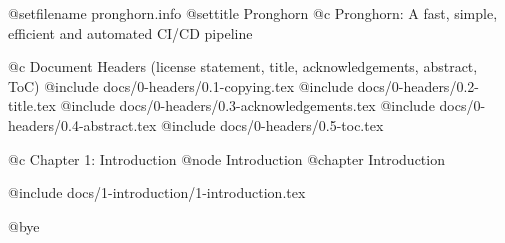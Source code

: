 
@setfilename pronghorn.info
@settitle Pronghorn
@c Pronghorn: A fast, simple, efficient and automated CI/CD pipeline


@c Document Headers (license statement, title, acknowledgements, abstract, ToC)
@include docs/0-headers/0.1-copying.tex
@include docs/0-headers/0.2-title.tex
@include docs/0-headers/0.3-acknowledgements.tex
@include docs/0-headers/0.4-abstract.tex
@include docs/0-headers/0.5-toc.tex


@c Chapter 1: Introduction
@node Introduction
@chapter Introduction

@include docs/1-introduction/1-introduction.tex


@bye
